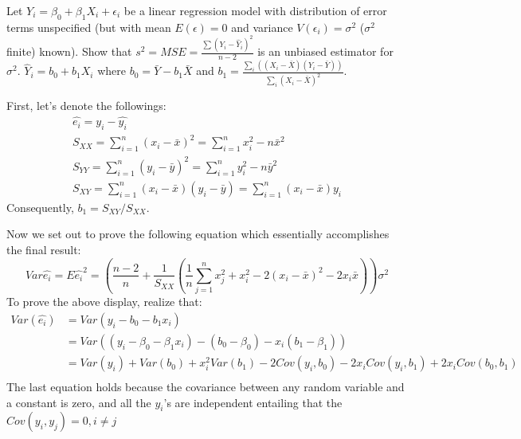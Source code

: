 \documentclass[12pt]{article}
\begin{document}
 { Let $Y_i = \beta_0 + \beta_1 X_i + \epsilon_i$ be a
linear regression model with distribution of error terms unspecified
(but with mean $E(\epsilon) = 0$ and variance $V(\epsilon_i) =
\sigma^2$ ($\sigma^2$ finite) known).  Show that $s^2 = MSE =
\frac{\sum(Y_i-\hat Y_i)^2}{n-2}$ is an unbiased estimator for
$\sigma^2$.  $\hat Y_i = b_0 + b_1 X_i$ where $b_0 = \bar Y - b_1
\bar X$ and $b_1 = \frac{\sum_i((X_i-\bar X)(Y_i - \bar
Y))}{\sum_i(X_i-\bar X)^2}$. } { \vfill
  \answer
}
{
First, let's denote the followings:\\
\begin{equation*}
\begin{array}{l}
\hat{e_i}=y_i-\hat{y_i}\\
S_{XX}=\displaystyle\sum_{i=1}^n (x_i-\bar{x})^2=\displaystyle\sum_{i=1}^n x_i^2-n\bar{x}^2\\
S_{YY}=\displaystyle\sum_{i=1}^n (y_i-\bar{y})^2=\displaystyle\sum_{i=1}^n y_i^2-n\bar{y}^2\\
S_{XY}=\displaystyle\sum_{i=1}^n (x_i-\bar{x})(y_i-\bar{y})=\displaystyle\sum_{i=1}^n (x_i-\bar{x})y_i
\end{array}
\end{equation*}
Consequently, $b_1=S_{XY}/S_{XX}$.

Now we set out to prove the following equation which essentially accomplishes the final result:\\
\[Var\hat{e_i}=E\hat{e_i}^2=(\frac{n-2}{n}+\frac{1}{S_{XX}}(\frac{1}{n}\displaystyle\sum_{j=1}^nx_j^2+x_i^2-2(x_i-\bar{x})^2-2x_i\bar{x}))\sigma^2\]
To prove the above display, realize that:\\
\begin{align*}
Var(\hat{e_i})&=Var(y_i-b_0-b_1x_i)\\
              &=Var((y_i-\beta_0-\beta_1x_i)-(b_0-\beta_0)-x_i(b_1-\beta_1))\\
              &=Var(y_i)+Var(b_0)+x_i^2Var(b_1)-2Cov(y_i,b_0)-2x_iCov(y_i,b_1)+2x_iCov(b_0,b_1)\\
\end{align*}
The last equation holds because the covariance between any random
variable and a constant is zero, and all the $y_i$'s are independent
entailing that the $Cov(y_i,y_j)=0,i\not=j$\\

}
\end{document}
